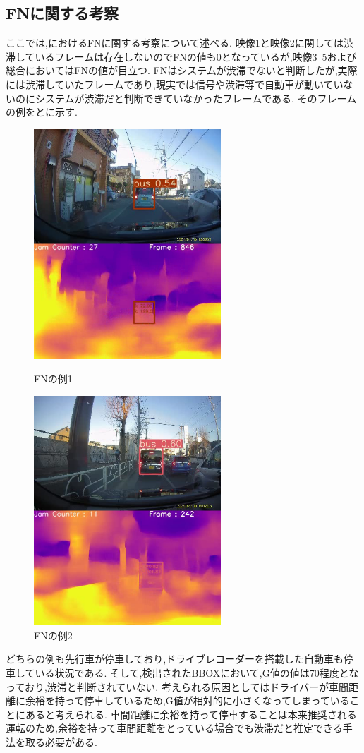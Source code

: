 \newpage
\subsection{FNに関する考察}
ここでは,におけるFNに関する考察について述べる.
映像1と映像2に関しては渋滞しているフレームは存在しないのでFNの値も0となっているが,映像3~5および総合においてはFNの値が目立つ.
FNはシステムが渋滞でないと判断したが,実際には渋滞していたフレームであり,現実では信号や渋滞等で自動車が動いていないのにシステムが渋滞だと判断できていなかったフレームである.
そのフレームの例をとに示す.

\begin{figure}[htbp]
  \begin{minipage}{0.5\hsize}
   \begin{center}
    \includegraphics[width=7cm]{figs/consider/fn01.png}
   \end{center}
   \caption{FNの例1}
   \label{fig:fn01}
  \end{minipage}
  \begin{minipage}{0.5\hsize}
  \begin{center}
   \includegraphics[width=7cm]{figs/consider/fn02.png}
  \end{center}
   \caption{FNの例2}
   \label{fig:fn02}
  \end{minipage}
 \end{figure}

どちらの例も先行車が停車しており,ドライブレコーダーを搭載した自動車も停車している状況である.
そして,検出されたBBOXにおいて,G値の値は70程度となっており,渋滞と判断されていない.
考えられる原因としてはドライバーが車間距離に余裕を持って停車しているため,G値が相対的に小さくなってしまっていることにあると考えられる.
車間距離に余裕を持って停車することは本来推奨される運転のため,余裕を持って車間距離をとっている場合でも渋滞だと推定できる手法を取る必要がある.

